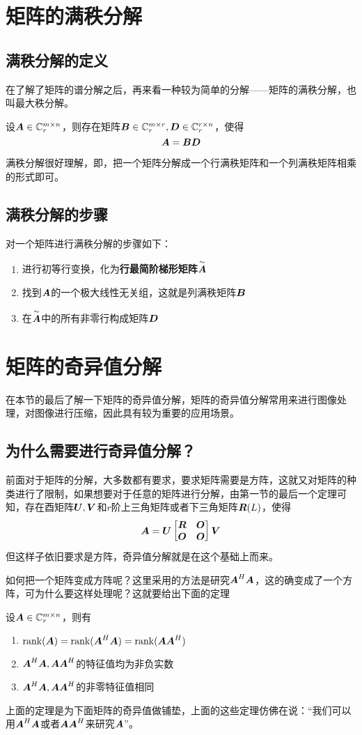 \documentclass[12pt, a4paper, oneside, UTF8]{ctexbook}
\begin{document}
\section{矩阵的满秩分解}
\subsection{满秩分解的定义}
在了解了矩阵的谱分解之后，再来看一种较为简单的分解——矩阵的满秩分解，也叫最大秩分解。
\begin{them}{}{}
    设$\boldsymbol{A}\in\mathbb{C}_r^{m\times n}$，则存在矩阵$\boldsymbol{B}\in\mathbb{C}_r^{m\times r}, \boldsymbol{D}\in\mathbb{C}_r^{r\times n}$，使得\[\boldsymbol{A}=\boldsymbol{B}\boldsymbol{D}\]
\end{them}

满秩分解很好理解，即，把一个矩阵分解成一个行满秩矩阵和一个列满秩矩阵相乘的形式即可。
\subsection{满秩分解的步骤}
对一个矩阵进行满秩分解的步骤如下：
\begin{enumerate}[leftmargin=4em]
    \item 进行初等行变换，化为\textbf{行最简阶梯形矩阵}$\overset{\sim}{\boldsymbol{A}}$
    \item 找到$\boldsymbol{A}$的一个极大线性无关组，这就是列满秩矩阵$\boldsymbol{B}$
    \item 在$\overset{\sim}{\boldsymbol{A}}$中的所有非零行构成矩阵$\boldsymbol{D}$
\end{enumerate}

\section{矩阵的奇异值分解}
在本节的最后了解一下矩阵的奇异值分解，矩阵的奇异值分解常用来进行图像处理，对图像进行压缩，因此具有较为重要的应用场景。
\subsection{为什么需要进行奇异值分解？}
前面对于矩阵的分解，大多数都有要求，要求矩阵需要是方阵，这就又对矩阵的种类进行了限制，如果想要对于任意的矩阵进行分解，由第一节的最后一个定理可知，存在酉矩阵$\boldsymbol{U},\boldsymbol{V}$和$r$阶上三角矩阵或者下三角矩阵$\boldsymbol{R}(L)$，使得\[\boldsymbol{A}=\boldsymbol{U}\begin{bmatrix}
    \boldsymbol{R}&\boldsymbol{O}\\
    \boldsymbol{O}&\boldsymbol{O}
\end{bmatrix}\boldsymbol{V}\]
但这样子依旧要求是方阵，奇异值分解就是在这个基础上而来。

如何把一个矩阵变成方阵呢？这里采用的方法是研究$\boldsymbol{A}^H\boldsymbol{A}$，这的确变成了一个方阵，可为什么要这样处理呢？这就要给出下面的定理
\begin{them}{}{}
    设$\boldsymbol{A}\in\mathbb{C}^{m\times n}_r$，则有
    \begin{enumerate}
        \item $\text{rank}(\boldsymbol{A})=\text{rank}(\boldsymbol{A}^H\boldsymbol{A})=\text{rank}(\boldsymbol{A}\boldsymbol{A}^H)$
        \item $\boldsymbol{A}^H\boldsymbol{A}, \boldsymbol{A}\boldsymbol{A}^H$的特征值均为非负实数
        \item $\boldsymbol{A}^H\boldsymbol{A}, \boldsymbol{A}\boldsymbol{A}^H$的非零特征值相同
    \end{enumerate}
\end{them}
上面的定理是为下面矩阵的奇异值做铺垫，上面的这些定理仿佛在说：“我们可以用$\boldsymbol{A}^H\boldsymbol{A}$或者$\boldsymbol{A}\boldsymbol{A}^H$来研究$\boldsymbol{A}$”。
\end{document}
